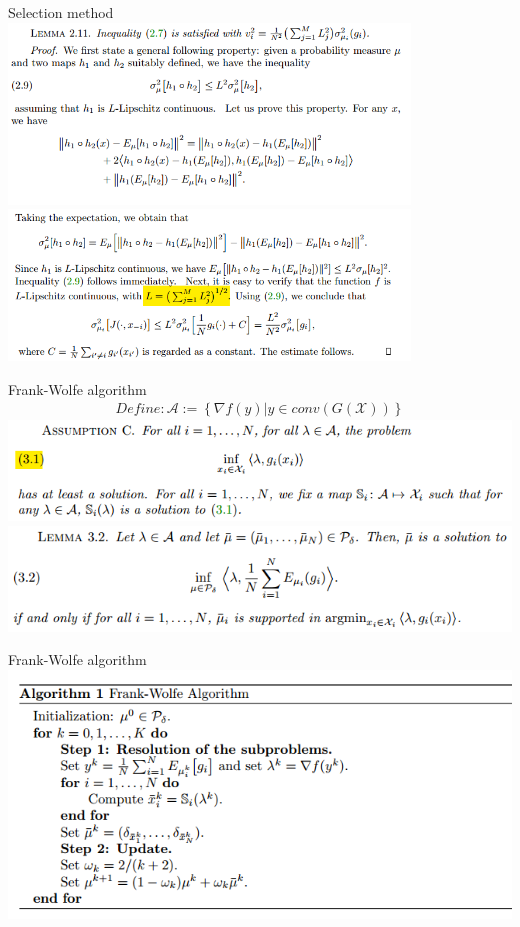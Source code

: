 \documentclass{beamer}
\begin{document}
\begin{frame}{Selection method}
	\includegraphics[width=0.8\textwidth]{kde/16.png}
	\\
		\includegraphics[width=0.8\textwidth]{kde/17.png}
\end{frame}

\begin{frame}{Frank-Wolfe algorithm}
	\begin{align}
		Define:\mathcal{A}:=\left\{\nabla f(y)|y\in conv(G(\mathcal{X}))\right\} \nonumber
	\end{align}
	\includegraphics[width=\textwidth]{kde/6.png}
	\includegraphics[width=\textwidth]{kde/7.png}
\end{frame}

\begin{frame}{Frank-Wolfe algorithm}
	\includegraphics[width=\textwidth]{kde/8.png}
\end{frame}
\end{document}
